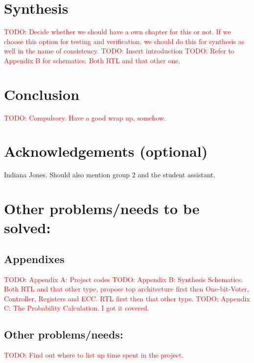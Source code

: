 \documentclass[a4paper]{IEEEtran}
\newcommand\TODO[1]{\textcolor{red}{TODO:#1}}
\newcommand\todo[1]{\TODO{#1}}
\begin{document}
\section{Synthesis }
\todo{ Decide whether we should have a own chapter for this or not. If we choose this option for testing and verification, we should do this for synthesis as well in the name of consistency. }
\break
\break
\todo{ Insert introduction }
\break
\break
\todo{ Refer to Appendix B for schematics. Both RTL and that other one. }


\section{Conclusion}
\todo{ Compulsory. Have a good wrap up, somehow. }

\section{Acknowledgements (optional)}

Indiana Jones. Should also mention group 2 and the student assistant.

\section{ Other problems/needs to be solved:}
\subsection{ Appendixes}
\todo{ Appendix A: Project codes }
\break
\break
\todo{ Appendix B: Synthesis Schematics. Both RTL and that other type, propose top architecture first then One-bit-Voter, Controller, Registers and ECC. RTL first then that other type.}
\break
\break
\todo{ Appendix C: The Probability Calculation. I got it covered. }
\subsection{ Other problems/needs:}
\todo{ Find out where to list up time spent in the project.}


\nocite{*}
\end{document}
